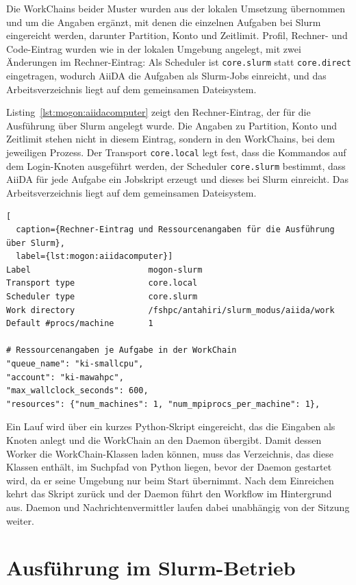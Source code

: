 Die WorkChains beider Muster wurden aus der lokalen Umsetzung
übernommen und um die Angaben ergänzt, mit denen die einzelnen
Aufgaben bei Slurm eingereicht werden, darunter Partition, Konto
und Zeitlimit. Profil, Rechner- und Code-Eintrag wurden wie in der
lokalen Umgebung angelegt, mit zwei Änderungen im Rechner-Eintrag:
Als Scheduler ist \texttt{core.slurm} statt \texttt{core.direct}
eingetragen, wodurch AiiDA die Aufgaben als Slurm-Jobs einreicht,
und das Arbeitsverzeichnis liegt auf dem gemeinsamen Dateisystem.

Listing~\ref{lst:mogon:aiidacomputer} zeigt den Rechner-Eintrag, der
für die Ausführung über Slurm angelegt wurde. Die Angaben zu
Partition, Konto und Zeitlimit stehen nicht in diesem Eintrag,
sondern in den WorkChains, bei dem jeweiligen Prozess. Der Transport
\texttt{core.local} legt fest, dass die Kommandos auf dem
Login-Knoten ausgeführt werden, der Scheduler \texttt{core.slurm}
bestimmt, dass AiiDA für jede Aufgabe ein Jobskript erzeugt und
dieses bei Slurm einreicht. Das Arbeitsverzeichnis liegt auf dem
gemeinsamen Dateisystem. 

\begin{lstlisting}[
  caption={Rechner-Eintrag und Ressourcenangaben für die Ausführung über Slurm},
  label={lst:mogon:aiidacomputer}]
Label                        mogon-slurm
Transport type               core.local
Scheduler type               core.slurm
Work directory               /fshpc/antahiri/slurm_modus/aiida/work
Default #procs/machine       1

# Ressourcenangaben je Aufgabe in der WorkChain
"queue_name": "ki-smallcpu",
"account": "ki-mawahpc",
"max_wallclock_seconds": 600,
"resources": {"num_machines": 1, "num_mpiprocs_per_machine": 1},
\end{lstlisting}

Ein Lauf wird über ein kurzes Python-Skript eingereicht, das die
Eingaben als Knoten anlegt und die WorkChain an den Daemon
übergibt. Damit dessen Worker die WorkChain-Klassen laden können, muss das Verzeichnis, das diese Klassen enthält, im Suchpfad von Python liegen, bevor der Daemon gestartet wird, da er seine Umgebung nur beim Start übernimmt. Nach dem Einreichen kehrt das Skript zurück und der
Daemon führt den Workflow im Hintergrund aus. Daemon und
Nachrichtenvermittler laufen dabei unabhängig von der Sitzung
weiter.


\section{Ausführung im Slurm-Betrieb}
\label{sec:mogon:slurmbetrieb}

